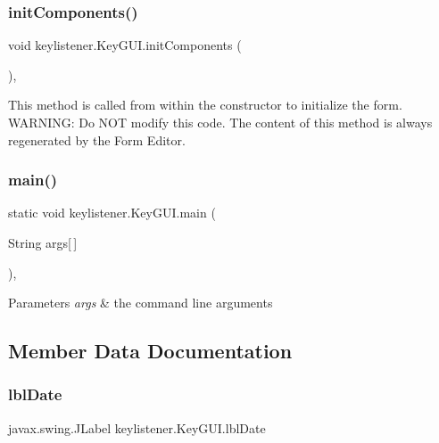 \subsubsection{\texorpdfstring{init\+Components()}{initComponents()}}
{\footnotesize\ttfamily void keylistener.\+Key\+G\+U\+I.\+init\+Components (\begin{DoxyParamCaption}{ }\end{DoxyParamCaption})\hspace{0.3cm}{\ttfamily [inline]}, {\ttfamily [private]}}

This method is called from within the constructor to initialize the form. W\+A\+R\+N\+I\+NG\+: Do N\+OT modify this code. The content of this method is always regenerated by the Form Editor. \mbox{\label{classkeylistener_1_1_key_g_u_i_ac0043858e116673e920af7f1542f5376}} 
\subsubsection{\texorpdfstring{main()}{main()}}
{\footnotesize\ttfamily static void keylistener.\+Key\+G\+U\+I.\+main (\begin{DoxyParamCaption}\item[{String}]{args\mbox{[}$\,$\mbox{]} }\end{DoxyParamCaption})\hspace{0.3cm}{\ttfamily [inline]}, {\ttfamily [static]}}


\begin{DoxyParams}{Parameters}
{\em args} & the command line arguments \\
\hline
\end{DoxyParams}


\subsection{Member Data Documentation}
\mbox{\label{classkeylistener_1_1_key_g_u_i_ad2118979cc01e139f390529e68561b36}} 
\subsubsection{\texorpdfstring{lbl\+Date}{lblDate}}
{\footnotesize\ttfamily javax.\+swing.\+J\+Label keylistener.\+Key\+G\+U\+I.\+lbl\+Date\hspace{0.3cm}{\ttfamily [private]}}

